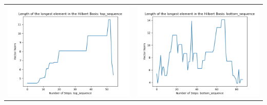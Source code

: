 \documentclass[10pt]{article}
\begin{document}
\begin{tabular}{c|c}
\begin{minipage}{.45\textwidth}
\includegraphics[width=\textwidth]{"DATA/4d/5 generators 2 bound H/top_sequence LENGTH"}
\end{minipage} &
\begin{minipage}{.45\textwidth}
\includegraphics[width=\textwidth]{"DATA/4d/5 generators 2 bound H bottomup/bottom_sequence LENGTH"}
\end{minipage}
\end{tabular}
\end{document}
